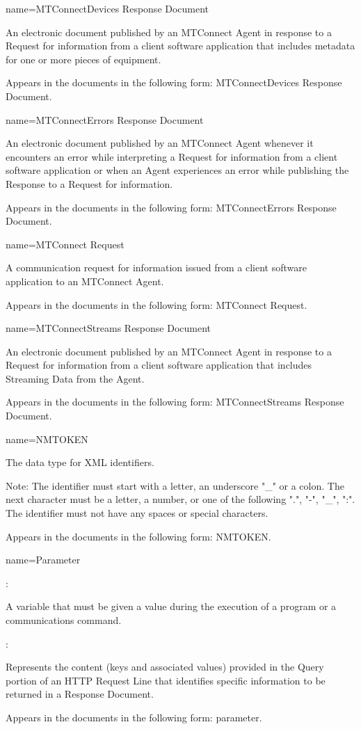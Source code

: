 {
  name={MTConnectDevices Response Document}
}
{
	An electronic document published by an MTConnect Agent in response to a Request for information from a client software application that includes metadata for one or more pieces of equipment.

	Appears in the documents in the following form: MTConnectDevices Response Document.
}


{
  name={MTConnectErrors Response Document}
}
{
	An electronic document published by an MTConnect Agent whenever it encounters an error while interpreting a Request for information from a client software application or when an Agent experiences an error while publishing the Response to a Request for information.

	Appears in the documents in the following form: MTConnectErrors Response Document.
}


{
  name={MTConnect Request}
}
{
	A communication request for information issued from a client software application to an MTConnect Agent.

	Appears in the documents in the following form: MTConnect Request.
}


{
  name={MTConnectStreams Response Document}
}
{
	An electronic document published by an MTConnect Agent in response to a Request for information from a client software application that includes Streaming Data from the Agent.

	Appears in the documents in the following form: MTConnectStreams Response Document.
}


{
  name={NMTOKEN}
}
{
	The data type for XML identifiers.

	Note: The identifier must start with a letter, an underscore "\_" or a colon.  The next character must be a letter, a number, or one of the following ".", "-", "\_", ":".  The identifier must not have any spaces or special characters.

	Appears in the documents in the following form: NMTOKEN.
}


{
  name={Parameter}
}
{
	:

	A variable that must be given a value during the execution of a program or a communications command.

	:

	Represents the content (keys and associated values) provided in the Query portion of an HTTP Request Line that identifies specific information to be returned in a Response Document.

	Appears in the documents in the following form: parameter.
}


